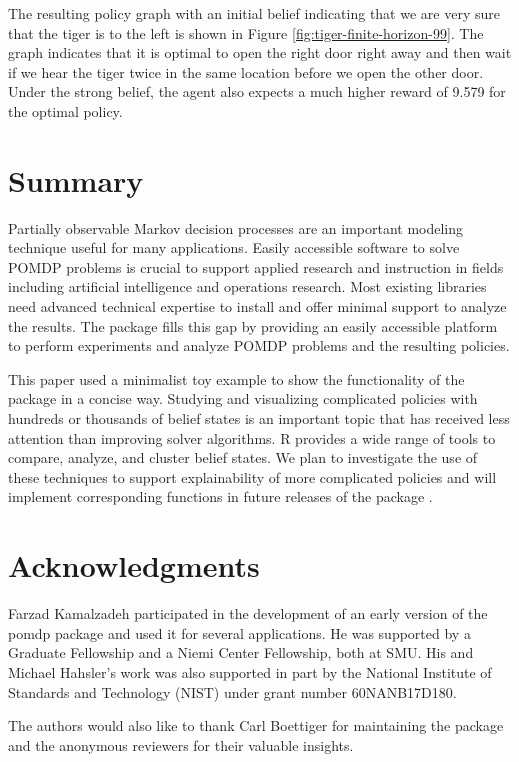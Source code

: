 The resulting policy graph with an initial belief indicating that we are very sure that the tiger
is to the left is shown in Figure \ref{fig:tiger-finite-horizon-99}. The graph
indicates that it is optimal to open the right door right away and then wait if we hear the tiger twice in the same location before we open the other door.
Under the strong belief, the agent also expects a much higher reward of
9.579 for the optimal policy.

\section{Summary}\label{summary}

Partially observable Markov decision processes are an important modeling technique useful
for many applications.
Easily accessible software to solve POMDP problems is crucial to support applied research and instruction in fields including artificial intelligence and operations research. Most existing libraries need advanced technical expertise to install and offer minimal support to analyze the results. The  package fills this gap by providing an easily accessible platform to perform experiments and analyze POMDP problems and the resulting policies.

This paper used a minimalist toy example to show the functionality of the package in
a concise way.
Studying and visualizing complicated policies with hundreds or thousands of belief states
is an important topic that has received less attention than improving solver algorithms.
R provides a wide range of tools to compare, analyze, and cluster belief states. We plan
to investigate the use of these techniques to support
explainability of more complicated policies and will implement corresponding functions in
future releases of the package .

\section{Acknowledgments}\label{acknowledgments}

Farzad Kamalzadeh participated in the development of an early version of the pomdp package
and used it for several applications.
He was supported by a Graduate Fellowship and a Niemi Center Fellowship, both at SMU.
His and Michael Hahsler's work was also supported in part by
the National Institute of Standards and Technology (NIST) under grant number 60NANB17D180.

The authors would also like to thank Carl Boettiger for maintaining the package
 and the anonymous reviewers for their valuable insights.

